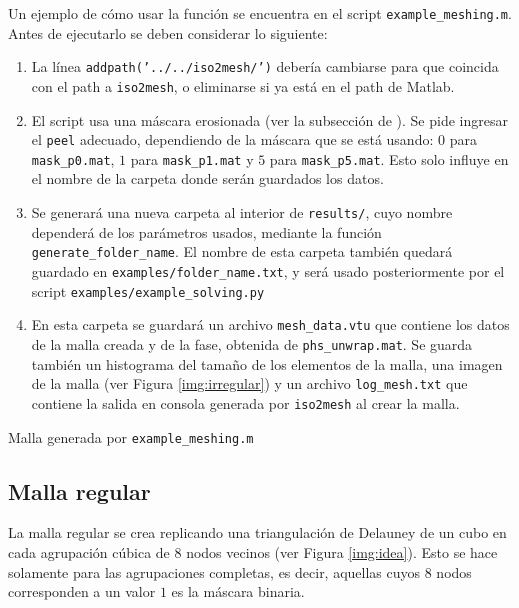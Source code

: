 Un ejemplo de cómo usar la función se encuentra en el script \texttt{example\_meshing.m}. Antes de ejecutarlo se deben considerar lo siguiente:


\begin{enumerate}
    \item La línea \texttt{addpath('../../iso2mesh/')} debería cambiarse para que coincida con el path a \texttt{iso2mesh}, o eliminarse si ya está en el path de Matlab.
    \item El script usa una máscara erosionada (ver la subsección  de ). Se pide ingresar el \texttt{peel} adecuado, dependiendo de la máscara que se está usando: $0$ para \texttt{mask\_p0.mat}, $1$ para \texttt{mask\_p1.mat} y $5$ para \texttt{mask\_p5.mat}. Esto solo influye en el nombre de la carpeta donde serán guardados los datos.
    \item Se generará una nueva carpeta al interior de \texttt{results/}, cuyo nombre dependerá de los parámetros usados, mediante la función \texttt{generate\_folder\_name}. El nombre de esta carpeta también quedará guardado en \texttt{examples/folder\_name.txt}, y será usado posteriormente por el script \texttt{examples/example\_solving.py} 
    \item En esta carpeta se guardará un archivo \texttt{mesh\_data.vtu} que contiene los datos de la malla creada y de la fase, obtenida de \texttt{phs\_unwrap.mat}. Se guarda también un histograma del tamaño de los elementos de la malla, una imagen de la malla (ver Figura \ref{img:irregular}) y un archivo \texttt{log\_mesh.txt} que contiene la salida en consola generada por \texttt{iso2mesh} al crear la malla.
\end{enumerate}


\begin{images}[\label{img:irregular}]{Malla generada por \texttt{example\_meshing.m}}
\end{images}




\subsection{Malla regular}

La malla regular se crea replicando una triangulación de Delauney de un cubo en cada agrupación cúbica de 8 nodos vecinos (ver Figura \ref{img:idea}). Esto se hace solamente para las agrupaciones completas, es decir, aquellas cuyos 8 nodos corresponden a un valor $1$ es la máscara binaria. 


